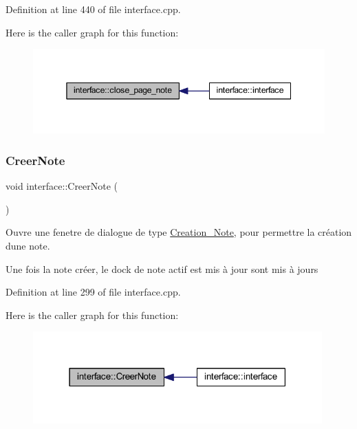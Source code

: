 Definition at line 440 of file interface.\+cpp.

Here is the caller graph for this function\+:\nopagebreak
\begin{figure}[H]
\begin{center}
\leavevmode
\includegraphics[width=345pt]{classinterface_abe2464522932a5d8ed76d1ba02c9d2c6_icgraph}
\end{center}
\end{figure}
\mbox{\label{classinterface_a23957135caad59d8850fe8e2cbee28a3}} 
\subsubsection{\texorpdfstring{Creer\+Note}{CreerNote}}
{\footnotesize\ttfamily void interface\+::\+Creer\+Note (\begin{DoxyParamCaption}{ }\end{DoxyParamCaption})\hspace{0.3cm}{\ttfamily [slot]}}



Ouvre une fenetre de dialogue de type \hyperlink{class_creation___note}{Creation\+\_\+\+Note}, pour permettre la création d\textquotesingle{}une note. 

Une fois la note créer, le dock de note actif est mis à jour sont mis à jours 

Definition at line 299 of file interface.\+cpp.

Here is the caller graph for this function\+:\nopagebreak
\begin{figure}[H]
\begin{center}
\leavevmode
\includegraphics[width=315pt]{classinterface_a23957135caad59d8850fe8e2cbee28a3_icgraph}
\end{center}
\end{figure}
\mbox{\label{classinterface_a319f133949e2be97a203f725c3f1e565}} 
